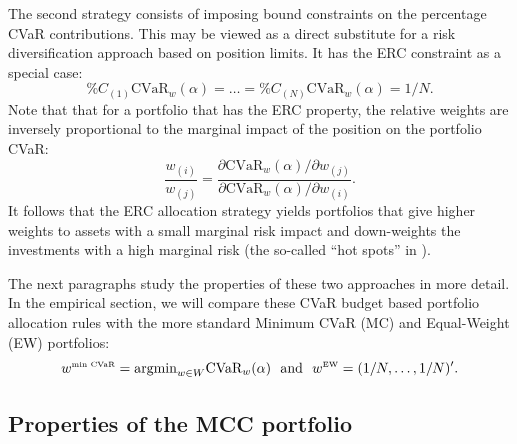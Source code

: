 \documentclass[12pt,a4paper]{article}
\newcommand{\argmin}{{\operatorname{argmin}}}
\begin{document}
The second strategy consists of imposing bound constraints on the percentage CVaR contributions. This may be viewed as a direct substitute for a risk diversification approach based on position limits. It has the ERC constraint as a special case:
\begin{equation}   \%C_{(1)}\mbox{CVaR}_w(\alpha)  = \ldots =  \%C_{(N)}\mbox{CVaR}_w(\alpha) = 1/N. \label{eq:ERCconstraint}\end{equation}
Note that that for a portfolio that has the ERC property, the relative weights are inversely proportional to the marginal impact of the position on the portfolio CVaR:
\begin{equation}   \frac{w_{(i)}}{w_{(j)}} = \frac{ \partial \mbox{CVaR}_w(\alpha)/\partial w_{(j)}}{ \partial \mbox{CVaR}_w(\alpha)/\partial w_{(i)}} . \label{eq:ERCconstraint}\end{equation} It follows that the ERC allocation strategy yields portfolios that give higher weights to assets with a small marginal risk impact and down-weights the investments with a high marginal risk (the so-called ``hot spots'' in \citealt{Litterman1996}).

The next paragraphs study the properties of these two approaches in more detail. In the empirical section, we will compare these CVaR budget based portfolio allocation rules with the more standard Minimum CVaR (MC) and Equal-Weight (EW) portfolios:
\begin{equation}   w^{\mbox{\tiny min CVaR}} = \argmin_{w \in W} \mbox{CVaR}_w(\alpha) \ \ \mbox{and} \ \ w^{\mbox{\tiny EW}} = (1/N,\ldots,1/N)'. \label{eq:benchmarkportfolios}\end{equation}

\subsection{Properties of the MCC portfolio}
\end{document}
